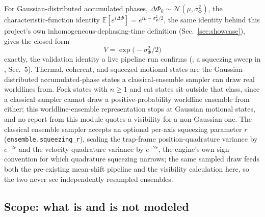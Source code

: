 \documentclass[aps,pra,superscriptaddress,groupedaddress,nofootinbib]{revtex4-2}
\begin{document}
For Gaussian-distributed accumulated phases, $\Delta\Phi_k\sim\mathcal
N(\mu,\sigma_\Phi^2)$, the characteristic-function identity
$\mathbb E[e^{i\Delta\Phi}]=e^{i\mu-\sigma_\Phi^2/2}$, the same identity
behind this project's own inhomogeneous-dephasing-time definition
(Sec.~\ref{sec:showcase}), gives the closed form
\begin{equation}
  V = \exp\bigl(-\sigma_\Phi^2/2\bigr)
  \label{eq:e39}
\end{equation}
exactly, the validation identity a live pipeline run confirms
(; a squeezing sweep in
, Sec.~5). Thermal,
coherent, and squeezed motional states are the Gaussian-distributed
accumulated-phase states a classical-ensemble sampler can draw real
worldlines from. Fock states with $n\ge1$ and cat states sit outside that
class, since a classical sampler cannot draw a positive-probability
worldline ensemble from either; this worldline-ensemble representation
stops at Gaussian motional states, and no report from this module quotes a
visibility for a non-Gaussian one. The classical ensemble sampler accepts an optional
per-axis squeezing parameter $r$ (\texttt{ensemble.squeezing\_r}), scaling
the trap-frame position-quadrature variance by $e^{-2r}$ and the
velocity-quadrature variance by $e^{+2r}$, the engine's own sign convention
for which quadrature squeezing narrows; the same sampled draw feeds both
the pre-existing mean-shift pipeline and the visibility calculation here, so
the two never see independently resampled ensembles.

\subsection{Scope: what is and is not modeled}
\end{document}
